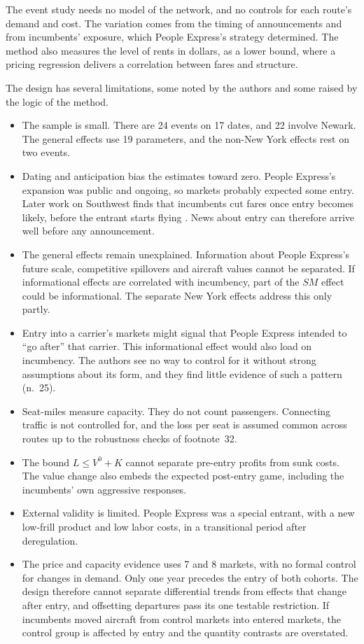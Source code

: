 The event study needs no model of the network, and no controls for each route's demand and cost.
The variation comes from the timing of announcements and from incumbents' exposure, which People
Express's strategy determined. The method also measures the level of rents in dollars, as a lower
bound, where a pricing regression delivers a correlation between fares and structure.

The design has several limitations, some noted by the authors and some raised by the logic of the
method.
\begin{itemize}
\item The sample is small. There are 24 events on 17 dates, and 22 involve Newark. The general effects
use 19 parameters, and the non-New York effects rest on two events.
\item Dating and anticipation bias the estimates toward zero. People Express's expansion was public
and ongoing, so markets probably expected some entry. Later work on Southwest finds that incumbents cut
fares once entry becomes likely, before the entrant starts flying \citep{GoolsbeeSyverson2008}. News
about entry can therefore arrive well before any announcement.
\item The general effects remain unexplained. Information about People Express's future scale,
competitive spillovers and aircraft values cannot be separated. If informational effects are
correlated with incumbency, part of the $\mathit{SM}$ effect could be informational. The separate New
York effects address this only partly.
\item Entry into a carrier's markets might signal that People Express intended to ``go after'' that
carrier. This informational effect would also load on incumbency. The authors see no way to control for
it without strong assumptions about its form, and they find little evidence of such a pattern (n.~25).
\item Seat-miles measure capacity. They do not count passengers. Connecting traffic is not controlled for, and the
loss per seat is assumed common across routes up to the robustness checks of footnote~32.
\item The bound $L\le V^0+K$ cannot separate pre-entry profits from sunk costs. The value change also
embeds the expected post-entry game, including the incumbents' own aggressive responses.
\item External validity is limited. People Express was a special entrant, with a new low-frill product
and low labor costs, in a transitional period after deregulation.
\item The price and capacity evidence uses 7 and 8 markets, with no formal control for changes in
demand. Only one year precedes the entry of both cohorts. The design therefore cannot separate
differential trends from effects that change after entry, and offsetting departures pass its one
testable restriction. If incumbents moved aircraft from control markets into entered markets, the control group is
affected by entry and the quantity contrasts are overstated.
\end{itemize}

